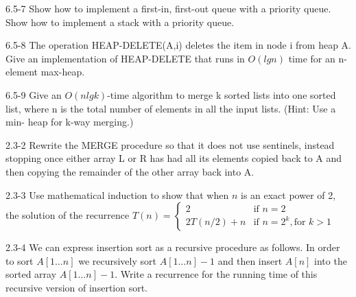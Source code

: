 





\homeworkheader{\classnameandsection}

\begin{problem}{6.5-7}
  Show how to implement a first-in, first-out queue with a priority queue. Show how to implement a stack with
  a priority queue.
\end{problem}

\begin{problem}{6.5-8}
  The operation HEAP-DELETE(A,i) deletes the item in node i from heap A. Give an implementation of HEAP-DELETE that runs
  in $O(lgn)$ time for an n-element max-heap.
\end{problem}

\begin{problem}{6.5-9}
  Give an $O(nlgk)$-time algorithm to merge k sorted lists into one sorted list, where n is the total number of elements in
  all the input lists. (Hint: Use a min- heap for k-way merging.)
\end{problem}

\begin{problem}{2.3-2}
  Rewrite the MERGE procedure so that it does not use sentinels, instead stopping once either array L or R has had all its
  elements copied back to A and then copying the remainder of the other array back into A.
\end{problem}

\begin{problem}{2.3-3}
Use mathematical induction to show that when $n$ is an exact power of 2, the solution of the recurrence
  $T(n) = \begin{cases}
    2 & \text{if } n = 2 \\
    2T(n/2) + n & \text{if } n = 2^k, \text{for } k >1
  \end{cases}
  $
\end{problem}

\begin{problem}{2.3-4}
  We can express insertion sort as a recursive procedure as follows. In order to sort $A[1\ldots n]$ we recursively sort
  $A[1\ldots n] - 1 $ and then insert $A[n]$ into the sorted array $A[1\ldots n] - 1 $.
  Write a recurrence for the running time of this recursive version of insertion sort.
\end{problem}


